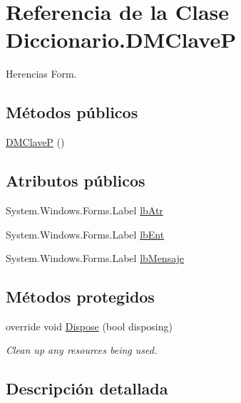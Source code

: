 \hypertarget{class_diccionario_1_1_d_m_clave_p}{\section{Referencia de la Clase Diccionario.\-D\-M\-Clave\-P}
\label{class_diccionario_1_1_d_m_clave_p}
}


Herencias Form.

\subsection*{Métodos públicos}
\begin{DoxyCompactItemize}
\item 
\hyperlink{class_diccionario_1_1_d_m_clave_p_a6301ee27c1391bdb0274992507ad627d}{D\-M\-Clave\-P} ()
\end{DoxyCompactItemize}
\subsection*{Atributos públicos}
\begin{DoxyCompactItemize}
\item 
System.\-Windows.\-Forms.\-Label \hyperlink{class_diccionario_1_1_d_m_clave_p_aa5474584d9fc3ec4b2b1e65146c0c131}{lb\-Atr}
\item 
System.\-Windows.\-Forms.\-Label \hyperlink{class_diccionario_1_1_d_m_clave_p_a3cd9f68a2444c4a1868a295bd65832e7}{lb\-Ent}
\item 
System.\-Windows.\-Forms.\-Label \hyperlink{class_diccionario_1_1_d_m_clave_p_a48afafd8bdc2823104bab68d05189cae}{lb\-Mensaje}
\end{DoxyCompactItemize}
\subsection*{Métodos protegidos}
\begin{DoxyCompactItemize}
\item 
override void \hyperlink{class_diccionario_1_1_d_m_clave_p_a59379d417d8b42598f09491afef935c0}{Dispose} (bool disposing)
\begin{DoxyCompactList}\small\item\em Clean up any resources being used. \end{DoxyCompactList}\end{DoxyCompactItemize}


\subsection{Descripción detallada}


